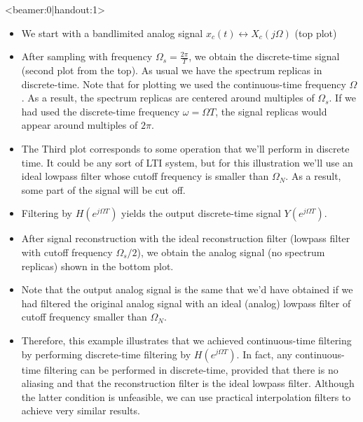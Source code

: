 \documentclass[10pt]{beamer}
\begin{document}
\begin{frame}<beamer:0|handout:1>
\fontsize{8pt}{7.2}\selectfont
\begin{itemize}
	\item We start with a bandlimited analog signal $x_c(t) \leftrightarrow X_c(j\Omega)$ (top plot)
	\item After sampling with frequency $\Omega_s = \frac{2\pi}{T}$, we obtain the discrete-time signal (second plot from the top). As usual we have the spectrum replicas in discrete-time. Note that for plotting we used the continuous-time frequency $\Omega$. As a result, the spectrum replicas are centered around multiples of $\Omega_s$. If we had used the discrete-time frequency $\omega = \Omega T$, the signal replicas would appear around multiples of $2\pi$.
	\item The Third plot corresponds to some operation that we'll perform in discrete time. It could be any sort of LTI system, but for this illustration we'll use an ideal lowpass filter whose cutoff frequency is smaller than $\Omega_N$. As a result, some part of the signal will be cut off.
	\item Filtering by $H(e^{j\Omega T})$ yields the output discrete-time signal $Y(e^{j\Omega T})$. 
	\item After signal reconstruction with the ideal reconstruction filter (lowpass filter with cutoff frequency $\Omega_s/2$), we obtain the analog signal (no spectrum replicas) shown in the bottom plot.
	\item Note that the output analog signal is the same that we'd have obtained if we had filtered the original analog signal with an ideal (analog) lowpass filter of cutoff frequency smaller than $\Omega_N$. 
	\item Therefore, this example illustrates that we achieved continuous-time filtering by performing discrete-time filtering by $H(e^{j\Omega T})$.  In fact, any continuous-time filtering can be performed in discrete-time, provided that there is no aliasing and that the reconstruction filter is the ideal lowpass filter. Although the latter condition is unfeasible, we can use practical interpolation filters to achieve very similar results.
\end{itemize}
\end{frame}
\end{document}

